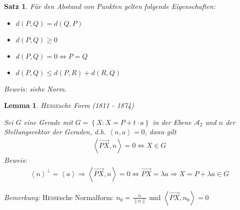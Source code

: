 \documentclass[%
a4paper,
11pt,		%
]
{scrartcl}
\theoremstyle{plain}
\theoremstyle{plain}
\newtheorem{mysatz}[mydef]{Satz}
\theoremstyle{plain}
\newtheorem{mylemma}[mydef]{Lemma}
\theoremstyle{plain}
\theoremstyle{plain}
\newcommand{\ora}{\overrightarrow}
\begin{document}
\begin{mysatz}
    Für den Abstand von Punkten gelten folgende Eigenschaften:
    \begin{itemize}
        \item[(i)] $d(P,Q) = d(Q,P)$
        \item[(ii)] $d(P,Q) \geq 0$
        \item[(iii)] $d(P,Q) = 0 \Leftrightarrow P = Q$
        \item[(iv)] $d(P,Q) \leq d(P,R) + d(R,Q)$
    \end{itemize}
    \textit{Beweis:} siehe Norm.
\end{mysatz}

\begin{mylemma}
    \textsc{Hesse}sche Form (1811 - 1874)

    Sei $G$ eine Gerade mit $G = \left\{ X : X = P+t \cdot a \right\}$ in der Ebene $\mathcal{A}_2$ und $n$ der Stellungsvektor der Geraden, d.h. $\left\langle n,a \right\rangle=0$, dann gilt
    \begin{align*}
        \left\langle \ora{PX} , n \right\rangle = 0 \Leftrightarrow X \in G
    \end{align*}
    \textit{Beweis:}
    \begin{align*}
        \left\langle n \right\rangle^{\bot} = \left\langle a \right\rangle \Rightarrow \left\langle \ora{PX} , n \right\rangle = 0 \Leftrightarrow \ora{PX} = \lambda a \Rightarrow X = P + \lambda a \in G
    \end{align*}
\end{mylemma}
\textit{Bemerkung:} \textsc{Hesse}sche Normalform: $n_0 = \frac{n}{\| n \|}$ und $\left\langle \ora{PX} , n_0 \right\rangle = 0$
\end{document}
